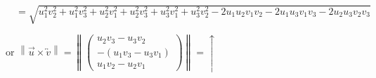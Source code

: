 \documentclass[12pt,a4paper]{report}
\newcommand*{\norme}[1]{\left\lVert{#1}\right\rVert}
\begin{document}
	$\quad=\sqrt{u_1^2v_2^2+u_1^2v_3^2+u_2^2v_1^2+u_2^2v_3^2+u_3^2v_1^2+u_3^2v_2^2 -2u_1u_2v_1v_2-2u_1u_3v_1v_3-2u_2u_3v_2v_3}$
	\medskip
	
	or $\norme{\overrightarrow{u}\times\overleftrightarrow{v}}=\norme{ \left( \begin{array}{c}
		u_2v_3-u_3v_2 \\
		-(u_1v_3-u_3v_1) \\
		u_1v_2-u_2v_1
		\end{array} \right)}=\uparrow$
	
		
	
	
	
	
	
	
	
	
	
	
	
	
	
	
	
	
	
	
	
\end{document}
